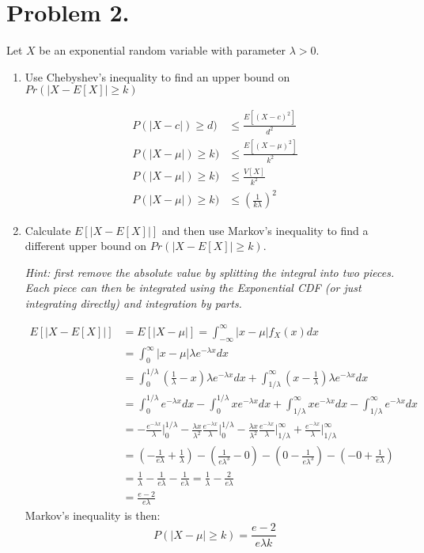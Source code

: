 \documentclass{article}
\newcommand{\1}{\mathbf{1}}
\begin{document}
\section*{Problem 2.}
Let $X$ be an exponential random variable with parameter $\lambda > 0$.
\begin{enumerate}
    \item Use Chebyshev's inequality to find an upper bound on $Pr(|X- E[X] | \geq k)$

    \begin{align*}
        P(|X-c|) \geq d) &\leq \frac{E[(X-c)^2]}{d^2} \\
        P(|X-\mu|) \geq k) &\leq \frac{E[(X-\mu)^2]}{k^2} \\
        P(|X-\mu|) \geq k) &\leq \frac{V[X]}{k^2} \\
        P(|X-\mu|) \geq k) &\leq \left(\frac{1}{k\lambda}\right)^2
    \end{align*}

    \item Calculate $E[ |X - E[X]|]$ and then use Markov's inequality to find a different upper bound on $Pr(|X- E[X] | \geq k)$.\par
    {\it Hint: first remove the absolute value by splitting the integral into two pieces. Each piece can then be integrated using the Exponential CDF (or just integrating directly) and integration by parts.}
    
    \begin{align*}
        E[|X - E[X]|] &= E[|X - \mu|] = \int_{-\infty}^\infty |x-\mu|f_X(x) dx \\
        &= \int_{0}^\infty |x-\mu|\lambda e^{-\lambda x} dx \\
        &= \int_0^{1/\lambda} \left(\frac{1}{\lambda} - x\right)\lambda e^{-\lambda x} dx 
            + \int_{1/\lambda}^\infty \left(x - \frac{1}{\lambda} \right)\lambda e^{-\lambda x} dx \\
        &= \int_0^{1/\lambda} e^{-\lambda x} dx 
            - \int_0^{1/\lambda} x e^{-\lambda x} dx
            + \int_{1/\lambda}^\infty xe^{-\lambda x} dx 
            - \int_{1/\lambda}^\infty e^{-\lambda x} dx \\
        &= -\frac{e^{-\lambda x}}{\lambda} \bigg|_0^{1/\lambda} 
            - \frac{\lambda x}{\lambda^2}\frac{e^{-\lambda x}}{\lambda} \bigg|_0^{1/\lambda}
            - \frac{\lambda x}{\lambda^2}\frac{e^{-\lambda x}}{\lambda} \bigg|_{1/\lambda}^\infty 
            + \frac{e^{-\lambda x}}{\lambda} \bigg|_{1/\lambda}^\infty \\
        &= \left(-\frac{1}{e\lambda}+ \frac{1}{\lambda}\right) 
            - \left(\frac{1}{e\lambda^3} - 0 \right) 
            - \left(0 - \frac{1}{e\lambda^3}\right) 
            - \left(-0 + \frac{1}{e\lambda}\right) \\
        &= \frac{1}{\lambda} - \frac{1}{e\lambda} - \frac{1}{e\lambda} = \frac{1}{\lambda} - \frac{2}{e\lambda}\\
        &= \frac{e-2}{e\lambda}
    \end{align*}
    Markov's inequality is then:
    $$P(|X-\mu|\geq k) = \frac{e-2}{e \lambda k}$$


\end{enumerate}
\end{document}
